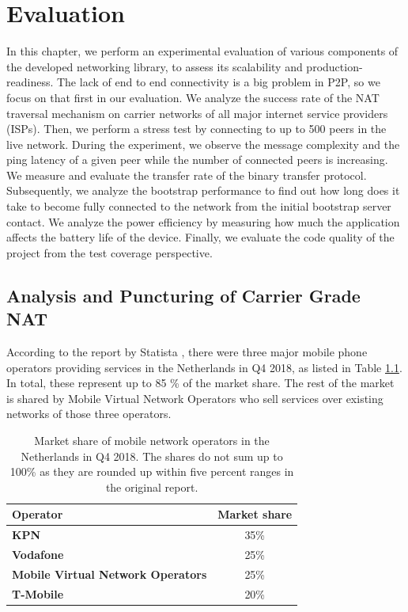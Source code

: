 
\chapter{Evaluation}
\label{evaluation}

In this chapter, we perform an experimental evaluation of various components of the developed networking library, to assess its scalability and production-readiness. The lack of end to end connectivity is a big problem in P2P, so we focus on that first in our evaluation. We analyze the success rate of the NAT traversal mechanism on carrier networks of all major internet service providers (ISPs). Then, we perform a stress test by connecting to up to 500 peers in the live network. During the experiment, we observe the message complexity and the ping latency of a given peer while the number of connected peers is increasing. We measure and evaluate the transfer rate of the binary transfer protocol. Subsequently, we analyze the bootstrap performance to find out how long does it take to become fully connected to the network from the initial bootstrap server contact. We analyze the power efficiency by measuring how much the application affects the battery life of the device. Finally, we evaluate the code quality of the project from the test coverage perspective.

\section{Analysis and Puncturing of Carrier Grade NAT}

According to the report by Statista \cite{statista:marketshare}, there were three major mobile phone operators providing services in the Netherlands in Q4 2018, as listed in Table \ref{table_marketshare}. In total, these represent up to 85 \% of the market share. The rest of the market is shared by Mobile Virtual Network Operators who sell services over existing networks of those three operators.

\begin{table}
    \centering
    \begin{tabular}{ | l | c | }
        \hline
        \textbf{Operator} & \textbf{Market share} \\
        \hline
        \textbf{KPN} & 35\% \\
        \textbf{Vodafone} & 25\% \\
        \textbf{Mobile Virtual Network Operators} & 25\% \\
        \textbf{T-Mobile} & 20\% \\
        \hline
    \end{tabular}
    \caption{Market share of mobile network operators in the Netherlands in Q4 2018. The shares do not sum up to 100\% as they are rounded up within five percent ranges in the original report. \cite{statista:marketshare}}
    \label{table_marketshare}
\end{table}

